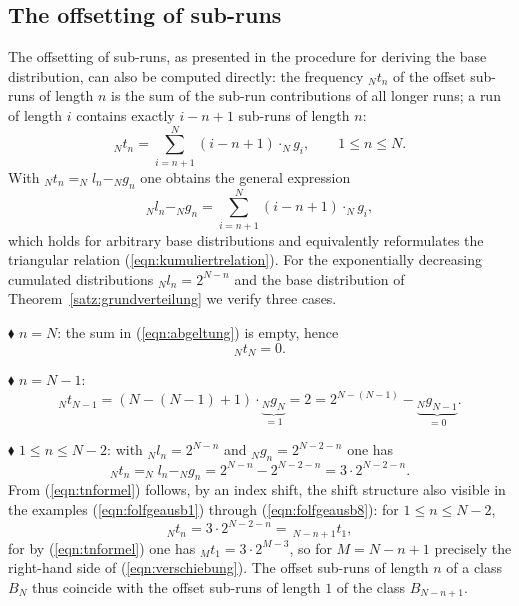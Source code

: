 \documentclass[11pt,a4paper]{scrartcl}
\theoremstyle{plain}
\theoremstyle{definition}
\theoremstyle{remark}
\begin{document}
\subsection{The offsetting of sub-runs}

The offsetting of sub-runs, as presented in the procedure for
deriving the base distribution, can also be computed directly: the
frequency $_Nt_n$ of the offset sub-runs of length $n$ is the sum of
the sub-run contributions of all longer runs; a run of length $i$
contains exactly $i-n+1$ sub-runs of length $n$:
\begin{equation}\label{eqn:abgeltung}
  _Nt_n=\sum_{i=n+1}^{N}\left(i-n+1\right)\cdot _Ng_i,\qquad 1\leq n\leq N.
\end{equation}
With $_Nt_n = _Nl_n - _Ng_n$ one obtains the general expression
\begin{equation}\label{eqn:abgegoltete}
  _Nl_n - _Ng_n=\sum_{i=n+1}^{N}\left(i-n+1\right)\cdot _Ng_i,
\end{equation}
which holds for arbitrary base distributions and equivalently
reformulates the triangular relation
(\ref{eqn:kumuliertrelation}). For the exponentially decreasing
cumulated distributions $_Nl_n=2^{N-n}$ and the base distribution of
Theorem~\ref{satz:grundverteilung} we verify three cases.

\noindent$\blacklozenge$ $n=N$: the sum in (\ref{eqn:abgeltung}) is
empty, hence
\begin{equation}
  _Nt_N=0.
\end{equation}

\noindent$\blacklozenge$ $n=N-1$:
\begin{equation}
  _Nt_{N-1}=\left(N-(N-1)+1\right)\cdot\underbrace{_Ng_N}_{=1}=2
  =2^{N-(N-1)}-\underbrace{_Ng_{N-1}}_{=0}.
\end{equation}

\noindent$\blacklozenge$ $1\leq n\leq N-2$: with $_Nl_n=2^{N-n}$ and
$_Ng_n=2^{N-2-n}$ one has
\begin{equation}\label{eqn:tnformel}
  _Nt_n=_Nl_n-_Ng_n=2^{N-n}-2^{N-2-n}=3\cdot 2^{N-2-n}.
\end{equation}
From (\ref{eqn:tnformel}) follows, by an index shift, the shift
structure also visible in the examples (\ref{eqn:folfgeausb1})
through (\ref{eqn:folfgeausb8}): for $1\leq n\leq N-2$,
\begin{equation}\label{eqn:verschiebung}
  _Nt_n=3\cdot 2^{N-2-n}=\,_{N-n+1}t_1,
\end{equation}
for by (\ref{eqn:tnformel}) one has $_Mt_1=3\cdot 2^{M-3}$, so for
$M=N-n+1$ precisely the right-hand side of
(\ref{eqn:verschiebung}). The offset sub-runs of length $n$ of a
class $B_N$ thus coincide with the offset sub-runs of length $1$ of
the class $B_{N-n+1}$.
\end{document}
